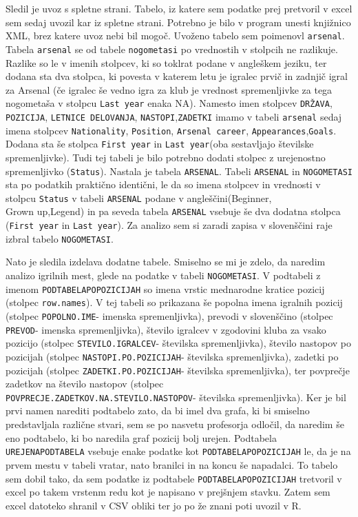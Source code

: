 \documentclass[11pt,a4paper]{article}
\begin{document}
Sledil je uvoz s spletne strani. Tabelo, iz katere sem podatke prej pretvoril v excel sem sedaj uvozil kar iz spletne strani. Potrebno je bilo v program unesti knjižnico XML, brez katere uvoz nebi bil mogoč. Uvoženo tabelo sem poimenovl \verb|arsenal|. Tabela \verb|arsenal| se od tabele \verb|nogometasi| po vrednostih v stolpcih ne razlikuje. Razlike so le v imenih stolpcev, ki so toklrat podane v angleškem jeziku, ter dodana sta dva stolpca, ki povesta v katerem letu je igralec prvič in zadnjič igral za Arsenal (če igralec še vedno igra za klub je vrednost spremenljivke za tega nogometaša v stolpcu \verb|Last year| enaka NA). Namesto imen stolpcev \verb|DRŽAVA|, \verb|POZICIJA|, \verb|LETNICE DELOVANJA|, \verb|NASTOPI|,\verb|ZADETKI| imamo v tabeli \verb|arsenal| sedaj imena stolpcev \verb|Nationality|, \verb|Position|, \verb|Arsenal career|, \verb|Appearances|,\verb|Goals|. Dodana sta še stolpca \verb|First year| in \verb|Last year|(oba sestavljajo številske spremenljivke). Tudi tej tabeli je bilo potrebno dodati stolpec z urejenostno spremenljivko (\verb|Status|). Nastala je tabela \verb|ARSENAL|. Tabeli \verb|ARSENAL| in \verb|NOGOMETASI| sta po podatkih praktično identični, le da so imena stolpcev in vrednosti v stolpcu  \verb|Status| v tabeli \verb|ARSENAL| podane v angleščini(Beginner,\\ Grown up,Legend) in pa seveda tabela \verb|ARSENAL| vsebuje še dva dodatna stolpca (\verb|First year| in \verb|Last year|). Za analizo sem si zaradi zapisa v slovenščini raje izbral tabelo \verb|NOGOMETASI|.

Nato je sledila izdelava dodatne tabele. Smiselno se mi je zdelo, da naredim analizo igrilnih mest, glede na podatke v tabeli \verb|NOGOMETASI|. V podtabeli z imenom \verb|PODTABELAPOPOZICIJAH| so imena vrstic mednarodne kratice pozicij (stolpec \verb|row.names|). V tej tabeli so prikazana še popolna imena igralnih pozicij (stolpec \verb|POPOLNO.IME|- imenska spremenljivka), prevodi v slovenščino (stolpec \verb|PREVOD|- imenska spremenljivka), število igralcev v zgodovini kluba za vsako pozicijo (stolpec \verb|STEVILO.IGRALCEV|- številska spremenljivka), število nastopov po pozicijah (stolpec \verb|NASTOPI.PO.POZICIJAH|- številska spremenljivka), zadetki po pozicijah (stolpec \texttt{ZADETKI.PO.POZI\-CI\-JAH}- številska spremenljivka), ter povprečje zadetkov na število nastopov (stolpec \verb|POVPRECJE.ZADETKOV.NA.STEVILO.NASTOPOV|- številska spremenljivka). Ker je bil prvi namen narediti podtabelo zato, da bi imel dva grafa, ki bi smiselno predstavljala različne stvari, sem se po nasvetu profesorja odločil, da naredim še eno podtabelo, ki bo naredila graf pozicij bolj urejen. Podtabela \verb|UREJENAPODTABELA| vsebuje enake podatke kot \verb|PODTABELAPOPOZICIJAH| le, da je na prvem mestu v tabeli vratar, nato branilci in na koncu še napadalci. To tabelo sem dobil tako, da sem podatke iz podtabele \verb|PODTABELAPOPOZICIJAH| tretvoril v excel po takem vrstenm redu kot je napisano v prejšnjem stavku. Zatem sem excel datoteko shranil v CSV obliki ter jo po že znani poti uvozil v R.
\end{document}

